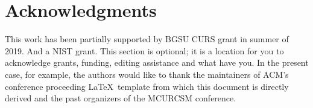 \documentclass{mcurcsm}
\begin{document}
\section{Acknowledgments} This work has been partially supported by BGSU CURS grant in summer of 2019. And a NIST grant.
This section is optional; it is a location for you to acknowledge grants,
funding, editing assistance and what have you.  In the present case, for
example, the authors would like to thank the maintainers of ACM's conference
proceeding \LaTeX\ template from which this document is directly derived and the
past organizers of the MCURCSM conference.

%

%


\end{document}
